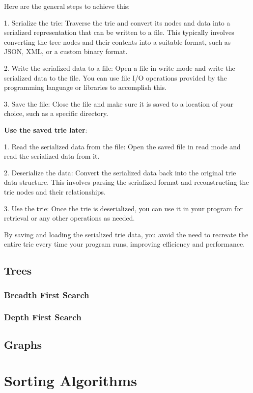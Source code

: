 Here are the general steps to achieve this:

1. Serialize the trie: Traverse the trie and convert its nodes and data
into a serialized representation that can be written to a file.
This typically involves converting the tree nodes and their contents into
a suitable format, such as JSON, XML, or a custom binary format.

2. Write the serialized data to a file:
Open a file in write mode and write the serialized data to the file.
You can use file I/O operations provided by the programming language or libraries to accomplish this.

3. Save the file: Close the file and make sure it is saved to a location of your choice,
such as a specific directory.

\textbf{Use the saved trie later}:

1. Read the serialized data from the file:
Open the saved file in read mode and read the serialized data from it.

2. Deserialize the data: Convert the serialized data back into the original trie data structure.
This involves parsing the serialized format and reconstructing the trie nodes and their relationships.

3. Use the trie: Once the trie is deserialized,
you can use it in your program for retrieval or any other operations as needed.

By saving and loading the serialized trie data,
you avoid the need to recreate the entire trie every time your program runs,
improving efficiency and performance.


\section{Trees}

\subsection{Breadth First Search}

\subsection{Depth First Search}


\section{Graphs}

\chapter{Sorting Algorithms}


